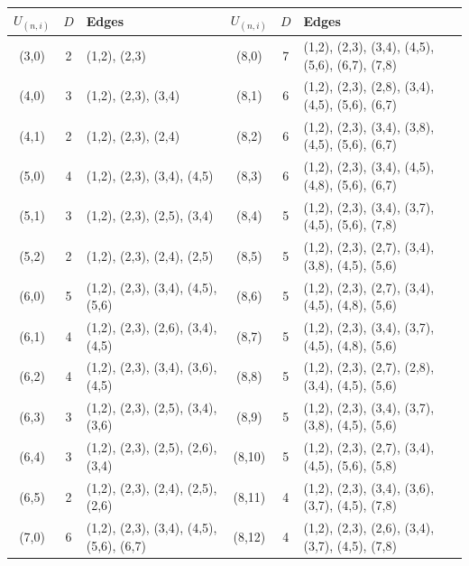\begin{table}[!ht]%
    \scriptsize
    \begin{center}
    \begin{tabular}{|c|c|l|||c|c|l|}

    \hline
    $U_{(n,i)}$ & $D$ & Edges & $U_{(n,i)}$ & $D$ & Edges \\
    \hline
    \hline
    (3,0) & 2 & (1,2), (2,3) & (8,0) & 7 & (1,2), (2,3), (3,4), (4,5), (5,6), (6,7), (7,8) \\
    \hline
    (4,0) & 3 & (1,2), (2,3), (3,4) & (8,1) & 6 & (1,2), (2,3), (2,8), (3,4), (4,5), (5,6), (6,7) \\
    \hline
    (4,1) & 2 & (1,2), (2,3), (2,4) & (8,2) & 6 & (1,2), (2,3), (3,4), (3,8), (4,5), (5,6), (6,7) \\
    \hline
    (5,0) & 4 & (1,2), (2,3), (3,4), (4,5) & (8,3) & 6 & (1,2), (2,3), (3,4), (4,5), (4,8), (5,6), (6,7) \\
    \hline
    (5,1) & 3 & (1,2), (2,3), (2,5), (3,4) & (8,4) & 5 & (1,2), (2,3), (3,4), (3,7), (4,5), (5,6), (7,8) \\
    \hline
    (5,2) & 2 & (1,2), (2,3), (2,4), (2,5) & (8,5) & 5 & (1,2), (2,3), (2,7), (3,4), (3,8), (4,5), (5,6) \\
    \hline
    (6,0) & 5 & (1,2), (2,3), (3,4), (4,5), (5,6) & (8,6) & 5 & (1,2), (2,3), (2,7), (3,4), (4,5), (4,8), (5,6) \\
    \hline
    (6,1) & 4 & (1,2), (2,3), (2,6), (3,4), (4,5) & (8,7) & 5 & (1,2), (2,3), (3,4), (3,7), (4,5), (4,8), (5,6) \\
    \hline
    (6,2) & 4 & (1,2), (2,3), (3,4), (3,6), (4,5) & (8,8) & 5 & (1,2), (2,3), (2,7), (2,8), (3,4), (4,5), (5,6) \\
    \hline
    (6,3) & 3 & (1,2), (2,3), (2,5), (3,4), (3,6) & (8,9) & 5 & (1,2), (2,3), (3,4), (3,7), (3,8), (4,5), (5,6) \\
    \hline
    (6,4) & 3 & (1,2), (2,3), (2,5), (2,6), (3,4) & (8,10) & 5 & (1,2), (2,3), (2,7), (3,4), (4,5), (5,6), (5,8) \\
    \hline
    (6,5) & 2 & (1,2), (2,3), (2,4), (2,5), (2,6) & (8,11) & 4 & (1,2), (2,3), (3,4), (3,6), (3,7), (4,5), (7,8) \\
    \hline
    (7,0) & 6 & (1,2), (2,3), (3,4), (4,5), (5,6), (6,7) & (8,12) & 4 & (1,2), (2,3), (2,6), (3,4), (3,7), (4,5), (7,8) \\

\end{tabular}
\end{center}
\end{table}

